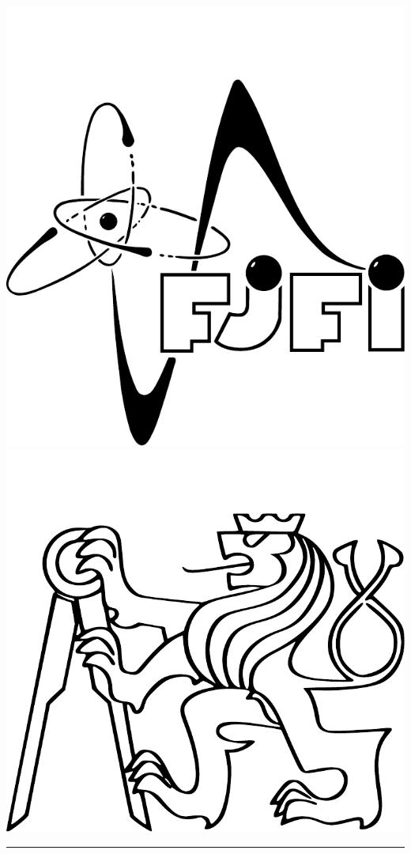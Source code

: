 \documentclass[english]{article}
\begin{document}
\begin{multicols}{2}
\begin{flushright}
\includegraphics[scale=0.28]{../../_meta/fjfi_standart.pdf}
\hspace{0.2cm}
\includegraphics[scale=0.28]{../../_meta/cvut_standart.pdf}
\end{flushright}
\end{multicols}
\hrule
\vspace{0.5cm}
\end{document}
